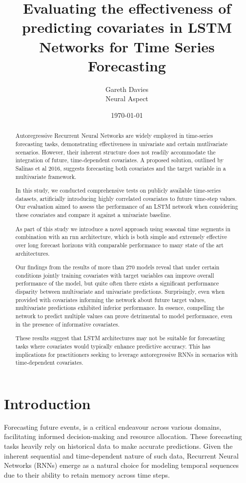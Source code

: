\documentclass{article}
\title{Evaluating the effectiveness of predicting covariates in LSTM Networks for Time Series Forecasting}
\author{Gareth Davies\\
Neural Aspect}
\date{\today}
\begin{document}
\maketitle

\begin{abstract}
Autoregressive Recurrent Neural Networks are widely employed in time-series forecasting tasks, 
demonstrating effectiveness in univariate and certain mutlivariate scenarios. However, their inherent structure
does not readily accommodate the integration of future, time-dependent covariates. A proposed solution, outlined by 
Salinas et al 2016\cite{salinas2019deepar}, suggests forecasting both covariates and the target variable 
in a multivariate framework.

In this study, we conducted comprehensive tests on publicly available time-series datasets, artificially 
introducing highly correlated covariates to future time-step values. Our evaluation aimed to assess the 
performance of an LSTM network when considering these covariates and compare it against a univariate baseline.

As part of this study we introduce a novel approach using seasonal time segments in combination with an rnn architecture, which is 
both simple and extremely effective over long forecast horizons with comparable performance 
to many state of the art architectures.

Our findings from the results of more than 270 models reveal that under certain conditions jointly training covariates 
with target variables can improve overall performance of the model, but quite often there exists a significant performance 
disparity between multivariate and univariate predictions. Surprisingly, even when provided with covariates informing the 
network about future target values, multivariate predictions exhibited inferior performance. 
In essence, compelling the network to predict multiple values 
can prove detrimental to model performance, even in the presence of informative covariates.

These results suggest that LSTM architectures may not be suitable for forecasting tasks where covariates 
would typically enhance predictive accuracy. This has implications for practitioners seeking to leverage 
autoregressive RNNs in scenarios with time-dependent covariates.
\end{abstract}

\section{Introduction}
Forecasting future events, is a critical endeavour across various domains, facilitating informed decision-making
and resource allocation. These forecasting tasks heavily rely on historical data to make accurate predictions. Given the inherent 
sequential and time-dependent nature of such data, Recurrent Neural Networks (RNNs) 
\cite{elman1990} emerge as a natural choice for modeling temporal sequences 
due to their ability to retain memory across time steps.
\end{document}

